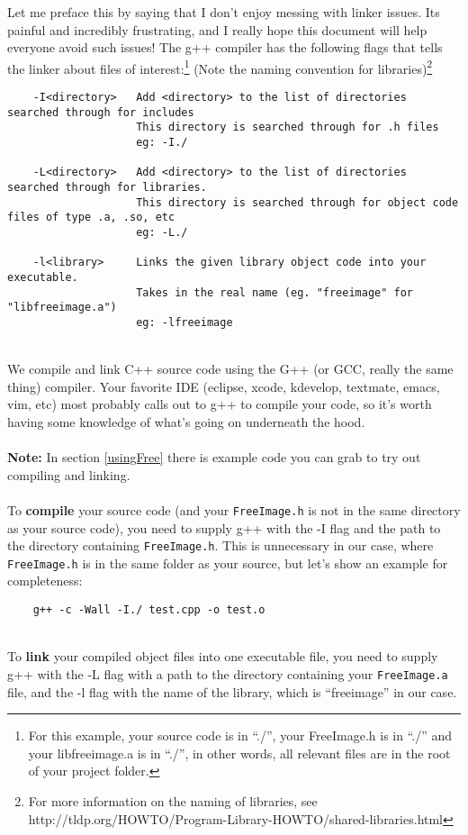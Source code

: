 \documentclass[]{article}
\begin{document}
Let me preface this by saying that I don't enjoy messing with linker issues. Its painful and incredibly frustrating, and I really hope this document will help everyone avoid such issues! The g++ compiler has the following flags that tells the linker about files of interest:\footnote{For this example, your source code is in ``./'', your FreeImage.h is in ``./'' and your libfreeimage.a is in ``./'', in other words, all relevant files are in the root of your project folder.} (Note the naming convention for libraries)\footnote{For more information on the naming of libraries, see http://tldp.org/HOWTO/Program-Library-HOWTO/shared-libraries.html}
\begin{verbatim}
    -I<directory>   Add <directory> to the list of directories searched through for includes
                    This directory is searched through for .h files
                    eg: -I./
        
    -L<directory>   Add <directory> to the list of directories searched through for libraries.
                    This directory is searched through for object code files of type .a, .so, etc
                    eg: -L./
    
    -l<library>     Links the given library object code into your executable.
                    Takes in the real name (eg. "freeimage" for "libfreeimage.a")
                    eg: -lfreeimage
\end{verbatim}
\\
We compile and link C++ source code using the G++ (or GCC, really the same thing) compiler. Your favorite IDE (eclipse, xcode, kdevelop, textmate, emacs, vim, etc) most probably calls out to g++ to compile your code, so it's worth having some knowledge of what's going on underneath the hood.
\\
\\
\textbf{Note:} In section \ref{usingFree} there is example code you can grab to try out compiling and linking.
\\
\\
To \textbf{compile} your source code (and your \verb=FreeImage.h= is not in the same directory as your source code), you need to supply g++ with the -I flag and the path to the directory containing \verb=FreeImage.h=. This is unnecessary in our case, where \verb=FreeImage.h= is in the same folder as your source, but let's show an example for completeness:

\begin{verbatim}
    g++ -c -Wall -I./ test.cpp -o test.o
\end{verbatim}
\\
To \textbf{link} your compiled object files into one executable file, you need to supply g++ with the -L flag with a path to the directory containing your \verb=FreeImage.a= file, and the -l flag with the name of the library, which is ``freeimage'' in our case.
\end{document}
